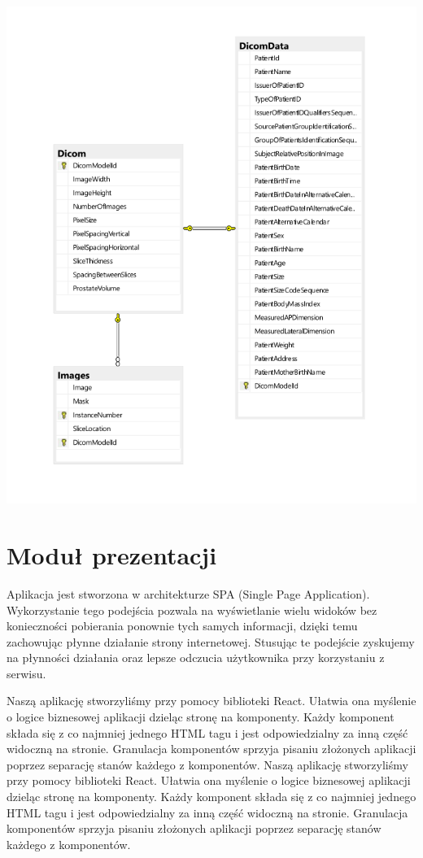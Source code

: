 \documentclass[a4paper,11pt,twoside]{report}
\theoremstyle{definition}
\begin{document}
\begin{minipage}{\linewidth}
	\centering
	\includegraphics[width=\textwidth]{Backend/SchematBazy.png}
\end{minipage}

\section{Moduł prezentacji}
Aplikacja jest stworzona w architekturze SPA (Single Page Application). Wykorzystanie tego podejścia pozwala na wyświetlanie wielu widoków bez konieczności pobierania ponownie tych samych informacji, dzięki temu zachowując płynne działanie strony internetowej. Stusując te podejście zyskujemy na płynności działania oraz lepsze odczucia użytkownika przy korzystaniu z serwisu.

Naszą aplikację stworzyliśmy przy pomocy biblioteki React. Ułatwia ona myślenie o logice biznesowej aplikacji dzieląc stronę na komponenty. Każdy komponent składa się z co najmniej jednego HTML tagu i jest odpowiedzialny za inną część widoczną na stronie. Granulacja komponentów sprzyja pisaniu złożonych aplikacji poprzez separację stanów każdego z komponentów.
Naszą aplikację stworzyliśmy przy pomocy biblioteki React. Ułatwia ona myślenie o logice biznesowej aplikacji dzieląc stronę na komponenty. Każdy komponent składa się z co najmniej jednego HTML tagu i jest odpowiedzialny za inną część widoczną na stronie. Granulacja komponentów sprzyja pisaniu złożonych aplikacji poprzez separację stanów każdego z komponentów.
\end{document}
